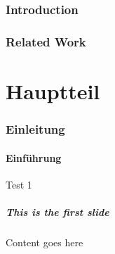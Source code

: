 \section{Introduction}
\label{sec:intro}







\section{Related Work}
\label{sec:RelWork}


%
\begin{frame}[plain]%
\titlepage%
\end{frame}%
%
%
\part{Hauptteil}
\begingroup\AtBeginSection[]{}
\section{Einleitung}%
\endgroup
\subsection{Einführung}%


\begin{frame}{Test 1}
	\frametitle{This is the first slide}
	Content goes here
\end{frame}


